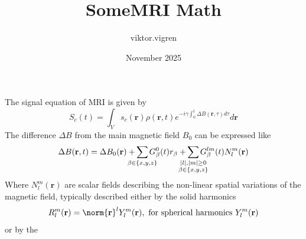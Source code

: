 \documentclass{article}
\title{SomeMRI Math}
\author{viktor.vigren }
\date{November 2025}
\begin{document}
The signal equation of MRI is given by
\begin{equation}
    S_c(t) = \int_V s_c(\mathbf{r})\rho(\mathbf{r}, t) e^{-i\gamma\int_0^t \Delta B(\mathbf{r},\tau) d\tau} d\mathbf{r}
\end{equation}
The difference $\Delta B$ from the main magnetic field $B_0$ can be expressed like
\begin{equation}
    \Delta B(\mathbf{r}, t) = 
        \Delta B_0(\mathbf{r}) + \hspace{-4mm}
        \sum_{\beta \in \{x,y,z\}} \hspace{-4mm} G^0_\beta(t)r_\beta  + \hspace{-4mm}
        \sum_{\substack{|l|,|m| \geq 0 \\ \beta \in \{x,y,z\}}} \hspace{-4mm} G^{lm}_\beta(t) N^m_l(\mathbf{r})
\end{equation}
Where $N^m_l(\mathbf{r})$ are scalar fields describing the non-linear spatial variations of the magnetic field,
typically described either by the solid harmonics
\begin{equation}
    R^m_l(\mathbf{r}) = \norm{\mathbf{r}}^l Y^m_l(\mathbf{r}), \text{ for spherical harmonics } Y^m_l(\mathbf{r})
\end{equation}
or by the 
\end{document}
